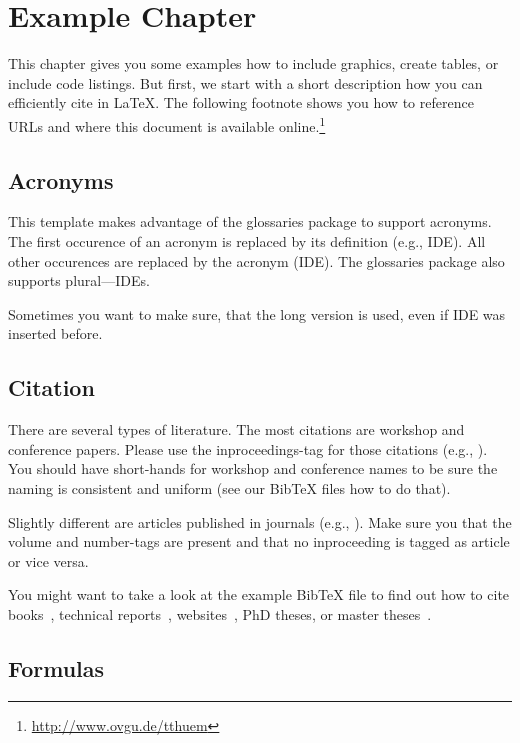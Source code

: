 \chapter{Example Chapter}
\label{example}

This chapter gives you some examples how to include graphics, create tables, or include code listings. But first, we start with a short description how you can efficiently cite in \LaTeX. The following footnote shows you how to reference URLs and where this document is available online.\footnote{\url{http://www.ovgu.de/tthuem}}

\section{Acronyms}

This template makes advantage of the glossaries package to support acronyms. The first occurence of an acronym is replaced by its definition (e.g., \gls{IDE}). All other occurences are replaced by the acronym (\gls{IDE}). The glossaries package also supports plural---\glspl{IDE}.

Sometimes you want to make sure, that the long version is used, even if \gls{IDE} was inserted before.
 
\section{Citation}

There are several types of literature. The most citations are workshop and conference papers. Please use the inproceedings-tag for those citations (e.g., \cite{KAK:GPCE09}). You should have short-hands for workshop and conference names to be sure the naming is consistent and uniform (see our BibTeX files how to do that).
 
Slightly different are articles published in journals (e.g., \cite{KG:SME06}). Make sure you that the volume and number-tags are present and that no inproceeding is tagged as article or vice versa.

You might want to take a look at the example BibTeX file to find out how to cite books~\cite{CE:BOOK00}, technical reports~\cite{KCHNP:TR90}, websites~\cite{Coq:website}, PhD theses, or master theses~\cite{B:PHD03,R:MT09}.

\section{Formulas}
 

